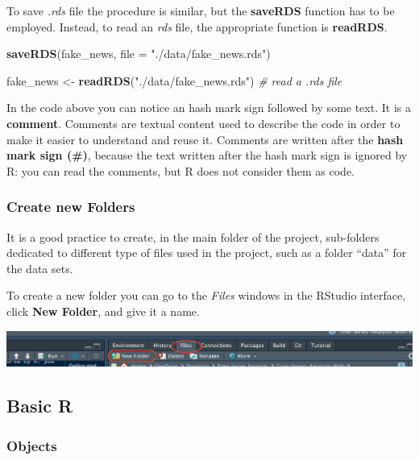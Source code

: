 \documentclass[
]{article}
\newenvironment{Shaded}{\begin{snugshade}}{\end{snugshade}}
\newcommand{\CommentTok}[1]{\textcolor[rgb]{0.56,0.35,0.01}{\textit{#1}}}
\newcommand{\DataTypeTok}[1]{\textcolor[rgb]{0.13,0.29,0.53}{#1}}
\newcommand{\KeywordTok}[1]{\textcolor[rgb]{0.13,0.29,0.53}{\textbf{#1}}}
\newcommand{\NormalTok}[1]{#1}
\newcommand{\StringTok}[1]{\textcolor[rgb]{0.31,0.60,0.02}{#1}}
\begin{document}
To save \emph{.rds} file the procedure is similar, but the \textbf{saveRDS} function has to be employed. Instead, to read an \emph{rds} file, the appropriate function is \textbf{readRDS}.

\begin{Shaded}
\begin{Highlighting}[]
\KeywordTok{saveRDS}\NormalTok{(fake_news, }\DataTypeTok{file =} \StringTok{"./data/fake_news.rds"}\NormalTok{)}

\NormalTok{fake_news <-}\StringTok{ }\KeywordTok{readRDS}\NormalTok{(}\StringTok{"./data/fake_news.rds"}\NormalTok{)   }\CommentTok{# read a .rds file}
\end{Highlighting}
\end{Shaded}

In the code above you can notice an hash mark sign followed by some text. It is a \textbf{comment}. Comments are textual content used to describe the code in order to make it easier to understand and reuse it. Comments are written after the \textbf{hash mark sign (\#)}, because the text written after the hash mark sign is ignored by R: you can read the comments, but R does not consider them as code.

\hypertarget{create-new-folders}{%
\subsubsection{Create new Folders}\label{create-new-folders}}

It is a good practice to create, in the main folder of the project, sub-folders dedicated to different type of files used in the project, such as a folder ``data'' for the data sets.

To create a new folder you can go to the \emph{Files} windows in the RStudio interface, click \textbf{New Folder}, and give it a name.

\includegraphics[width=23.99in]{images/new-folder}

\hypertarget{basic-r}{%
\subsection{Basic R}\label{basic-r}}

\hypertarget{objects}{%
\subsubsection{Objects}\label{objects}}
\end{document}
